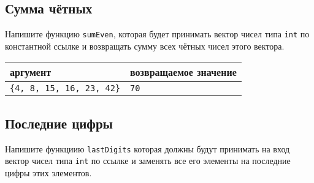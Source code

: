 \documentclass{article}
\begin{document}
\subsection{Сумма чётных}
Напишите функцию \texttt{sumEven}, которая будет принимать вектор чисел типа \texttt{int} по константной ссылке и возвращать сумму всех чётных чисел этого вектора.
\begin{center}
\begin{tabular}{ l | l }
 аргумент & возвращаемое значение \\ \hline
 \texttt{\{4, 8, 15, 16, 23, 42\}} & \texttt{70}
\end{tabular}
\end{center}

\subsection{Последние цифры}
Напишите функциию \texttt{lastDigits} которая должны будут принимать на вход вектор чисел типа \texttt{int} по ссылке и заменять все его элементы на последние цифры этих элементов.
\end{document}
